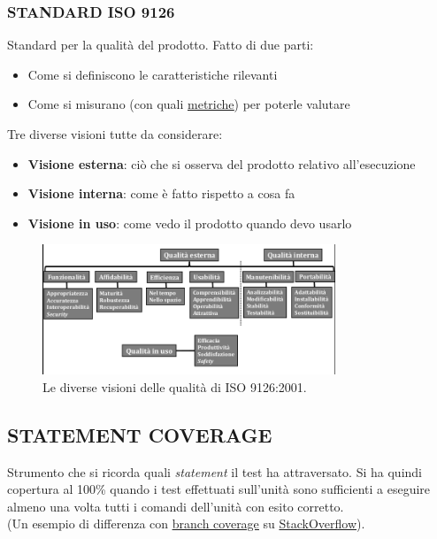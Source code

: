 			\subsubsection{STANDARD ISO 9126}		\label{9126} %
			Standard per la qualità del prodotto.
			Fatto di due parti:
				\begin{itemize}
					\item Come si definiscono le caratteristiche rilevanti
					\item Come si misurano (con quali \underline{\hyperref[metrica]{metriche}}) per poterle valutare
				\end{itemize}
			Tre diverse visioni tutte da considerare:
				\begin{itemize}
					\item \textbf{Visione esterna}: ciò che si osserva del prodotto relativo all'esecuzione
					\item \textbf{Visione interna}: come è fatto rispetto a cosa fa
					\item \textbf{Visione in uso}: come vedo il prodotto quando devo usarlo
				\end{itemize}

			\begin{figure}[H]
				\centering
				\includegraphics[width=0.78\textwidth]{img/9126}
				\caption{Le diverse visioni delle qualità di ISO 9126:2001.}
			\end{figure}


		\subsection{STATEMENT COVERAGE}	\label{statementcoverage}	
		Strumento che si ricorda quali \textit{statement} il test ha attraversato. Si ha quindi copertura al 100\% quando i test effettuati sull'unità sono sufficienti a eseguire almeno una volta tutti i comandi dell'unità con esito corretto. \\
		(Un esempio di differenza con \underline{\hyperref[branchcoverage]{branch coverage}} su \href{https://stackoverflow.com/questions/14519416/a-difference-between-statement-and-decision-coverage}{StackOverflow}).


